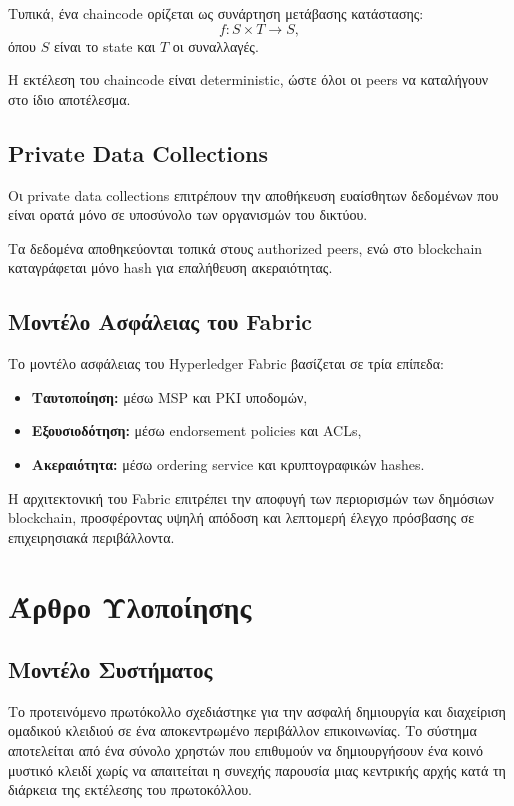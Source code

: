 \documentclass[12pt,a4paper]{report}
\begin{document}
Τυπικά, ένα chaincode ορίζεται ως συνάρτηση μετάβασης κατάστασης:
\[
f: S \times T \rightarrow S,
\]
όπου $S$ είναι το state και $T$ οι συναλλαγές.

Η εκτέλεση του chaincode είναι deterministic, ώστε όλοι οι peers να καταλήγουν στο ίδιο αποτέλεσμα.

\section{Private Data Collections}

Οι private data collections επιτρέπουν την αποθήκευση ευαίσθητων δεδομένων που είναι ορατά μόνο σε υποσύνολο των οργανισμών του δικτύου.

Τα δεδομένα αποθηκεύονται τοπικά στους authorized peers, ενώ στο blockchain καταγράφεται μόνο hash για επαλήθευση ακεραιότητας.

\section{Μοντέλο Ασφάλειας του Fabric}

Το μοντέλο ασφάλειας του Hyperledger Fabric βασίζεται σε τρία επίπεδα:

\begin{itemize}
    \item \textbf{Ταυτοποίηση:} μέσω MSP και PKI υποδομών,
    \item \textbf{Εξουσιοδότηση:} μέσω endorsement policies και ACLs,
    \item \textbf{Ακεραιότητα:} μέσω ordering service και κρυπτογραφικών hashes.
\end{itemize}

Η αρχιτεκτονική του Fabric επιτρέπει την αποφυγή των περιορισμών των δημόσιων blockchain, προσφέροντας υψηλή απόδοση και λεπτομερή έλεγχο πρόσβασης σε επιχειρησιακά περιβάλλοντα.
\chapter{Άρθρο Υλοποίησης}

\section{Μοντέλο Συστήματος}

Το προτεινόμενο πρωτόκολλο σχεδιάστηκε για την ασφαλή δημιουργία και διαχείριση ομαδικού κλειδιού σε ένα αποκεντρωμένο περιβάλλον επικοινωνίας. Το σύστημα αποτελείται από ένα σύνολο χρηστών που επιθυμούν να δημιουργήσουν ένα κοινό μυστικό κλειδί χωρίς να απαιτείται η συνεχής παρουσία μιας κεντρικής αρχής κατά τη διάρκεια της εκτέλεσης του πρωτοκόλλου.
\end{document}
